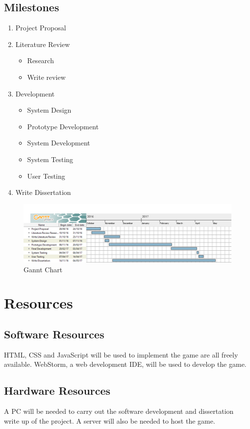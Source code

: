 \documentclass[12pt,a4paper]{report}
\begin{document}
\section{Milestones}
\begin{enumerate}
  \item Project Proposal
  \item Literature Review
  \begin{itemize}
  \item Research
  \item Write review
  \end{itemize}
  \item Development
  \begin{itemize}
  \item System Design
  \item Prototype Development
  \item System Development
  \item System Testing
  \item User Testing
  \end{itemize}
  \item Write Dissertation
\end{enumerate}

\begin{figure}[h]
\caption{Gannt Chart}
\centering
\label{fig:ganntchart}
\includegraphics[width=\textwidth,height=\textheight,keepaspectratio]{Gantt}
\end{figure}



{\let\clearpage\relax\chapter{Resources}}
\section{Software Resources}
HTML, CSS and JavaScript will be used to implement the game are all freely available. WebStorm, a web development IDE, will be used to develop the game.

\section{Hardware Resources}
A PC will be needed to carry out the software development and dissertation write up of the project. A server will also be needed to host the game.
\end{document}
